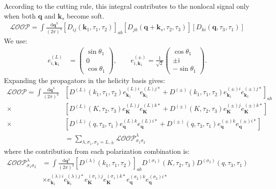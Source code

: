 \documentclass[a4paper,12pt]{article}
\def\di{{\mathrm{d}}}
\def\mb{\mathbf}
\def\ii{\mathrm{i}}
\begin{document}
According to the cutting rule, this integral contributes to the nonlocal signal only when both $\mb q$ and $\mb k_s$ become soft.
\begin{align}
    \mathcal{LOOP} = \int \frac{\di \mb{q}^3}{(2\pi)^3} \left[ D_{ij}(\mb k_1,\tau_1,\tau_2) \right]_{ab} \left[ D_{jk}(\mb q+\mb k_s,\tau_2,\tau_3) \right] \left[ D_{ki}( \mb{q},\tau_3,\tau_1) \right]
\end{align}
We use:
\begin{align}
    e_{i,\mathbf{k}_1}^{(L)}
    &= \begin{pmatrix} \sin\theta_1 \\ 0 \\ \cos\theta_1 \end{pmatrix}, \qquad
    e_{i,\mathbf{k}_1}^{(\pm)}
    = \frac{1}{\sqrt{2}}
    \begin{pmatrix}
    \cos\theta_1 \\
    \pm \ii \\
    -\sin\theta_1
    \end{pmatrix}.
\end{align}
Expanding the propagators in the helicity basis gives:
\begin{align}
    \mathcal{LOOP} = \int \frac{\di \mb{q}^3}{(2\pi)^3} &\left[ D^{(L)}(k_1,\tau_1,\tau_2) e^{(L)i}_{\mb k_1} e^{(L)j*}_{\mb k_1} + D^{(\pm)}(k_1,\tau_1,\tau_2) e^{(\pm)i}_{\mb k_1} e^{(\pm)j*}_{\mb k_1} \right]_{ab} \nonumber \\
    \times &\left[ D^{(L)}(K,\tau_2,\tau_3) e^{(L)j}_{\mb K} e^{(L)k*}_{\mb K} + D^{(\pm)}(K,\tau_2,\tau_3) e^{(\pm)j}_{\mb K} e^{(\pm)k*}_{\mb K} \right] \nonumber \\
    \times &\left[ D^{(L)}(q,\tau_3,\tau_1) e^{(L)k}_{\mb q} e^{(L)i*}_{\mb q} + D^{(\pm)}(q,\tau_3,\tau_1) e^{(\pm)k}_{\mb q} e^{(\pm)i*}_{\mb q} \right] \\
    &= \sum_{\lambda,\sigma_1,\sigma_2=L,\pm} 
    \mathcal{LOOP}_{\sigma_1\sigma_2}^{\lambda}
\end{align}
where the contribution from each polarization combination is:
\begin{align}
    \mathcal{LOOP}_{\sigma_1\sigma_2}^{\lambda} &= \int \frac{\di \mb{q}^3}{(2\pi)^3} 
    [D^{(\lambda)}(k_1,\tau_1,\tau_2)]_{ab} 
    D^{(\sigma_1)}(K,\tau_2,\tau_3) 
    D^{(\sigma_2)}(q,\tau_3,\tau_1) \nonumber \\
    &\times e^{(\lambda)i}_{\mb k_1} e^{(\lambda)j*}_{\mb k_1}
    e^{(\sigma_1)j}_{\mb K} e^{(\sigma_1)k*}_{\mb K}
    e^{(\sigma_2)k}_{\mb q} e^{(\sigma_2)i*}_{\mb q} 
\end{align}
\end{document}
